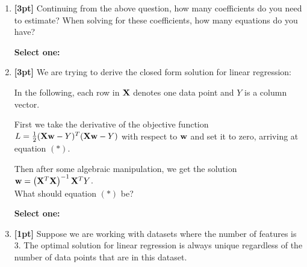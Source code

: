 \documentclass[12pt]{article}
\renewcommand{\circle}{\tikz\draw[black] (0,0) circle (1ex);}
\begin{document}
\begin{enumerate}
    
    
    \clearpage
    
    \item \textbf{[3pt]} Continuing from the above question, how many coefficients do you need to estimate? When solving for these coefficients, how many equations do you have?
    
    \textbf{Select one:}
    
    

    \item \textbf{[3pt]} We are trying to derive the closed form solution for linear regression:
    
    In the following, each row in $\mathbf{X}$ denotes one data point and $Y$ is a column vector.
    
    First we take the derivative of the objective function $L = \frac{1}{2}(\mathbf{X}\mathbf{w} - Y)^T(\mathbf{X}\mathbf{w} - Y)$ with respect to $\mathbf{w}$ and set it to zero, arriving at equation $(*)$.
    
    Then after some algebraic manipulation, we get the solution $\mathbf{w} = \left(\mathbf{X}^T\mathbf{X}\right)^{-1}\mathbf{X}^T Y$.\\
    What should equation $(*)$ be?
    
    \textbf{Select one:}
    
    
    \item \textbf{[1pt]} Suppose we are working with datasets where the number of features is 3. The optimal solution for linear regression is always unique regardless of the number of data points that are in this dataset.
    

\end{enumerate}
\end{document}
